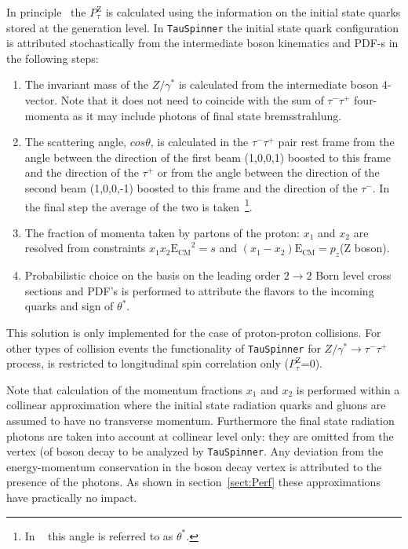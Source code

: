\documentclass[12pt]{article}
\def\Ztautau{\ensuremath{Z/\gamma^{*}\to\tau^{-}\tau^{+}}\xspace}
\def\TauTau{\ensuremath{\tau^{-}\tau^{+}}\xspace}
\def\TauMin{\ensuremath{\tau^-}\xspace}
\def\TauPlus{\ensuremath{\tau^+}\xspace}
\def\PTAUZ{\ensuremath{P_{\tau}^{\mathrm{Z}}}\xspace}
\begin{document}
In principle~\cite{TauSpinERWZW} the \PTAUZ 
is calculated using the information on the initial state quarks stored
at the generation level.
In {\tt TauSpinner} the initial state quark configuration is attributed 
stochastically from the intermediate boson
kinematics and PDF-s in the following steps:
\begin{enumerate}
\item
The invariant mass of the $Z/\gamma^*$ is calculated from 
the intermediate boson 4-vector. Note that it does not need to coincide
with the sum of \TauTau four-momenta as it may include photons
of final state bremsstrahlung.
\item The scattering angle, $cos\theta$, is calculated in the \TauTau
pair rest frame from the angle between the direction of the first beam (1,0,0,1)
boosted to this frame and the direction of the \TauPlus or from the angle 
between the direction of the second beam (1,0,0,-1) boosted to this frame
and the direction of the \TauMin. In the final step the average of the two is taken~\cite{Was:1989ce}\footnote{In ~\cite{Was:1989ce} this angle is referred to as $\theta^*$.}. 
\item The fraction of momenta taken by partons of the proton: $x_1$ and $x_2$ are resolved from
constraints $x_1x_2 \mathrm{E_{CM}}^2 = s$ and $ (x_1- x_2) \mathrm{E_{CM}}
={p}_z$(Z boson).
\item Probabilistic choice on the basis on the leading order $2\to 2$ Born level cross sections
and PDF's is performed to attribute the flavors to the incoming
quarks and sign of $\theta^*$. 
\end{enumerate}
This solution is only implemented for the case of proton-proton collisions.
For other types of collision events
the functionality of {\tt TauSpinner} for \Ztautau process, is restricted to 
longitudinal spin correlation only (\PTAUZ=0).


Note that calculation of the momentum fractions $x_1$ and $x_2$
is performed within a collinear approximation where
the initial state radiation quarks and gluons are assumed 
to have no transverse momentum. Furthermore
the final state radiation photons are taken into account at collinear level 
only: they are omitted from the  vertex (of boson decay to be analyzed by {\tt TauSpinner}. Any deviation 
from the energy-momentum conservation in the boson decay vertex is 
attributed to the presence of the photons.
As shown in section~\ref{sect:Perf}
these approximations have practically no impact.
\end{document}
